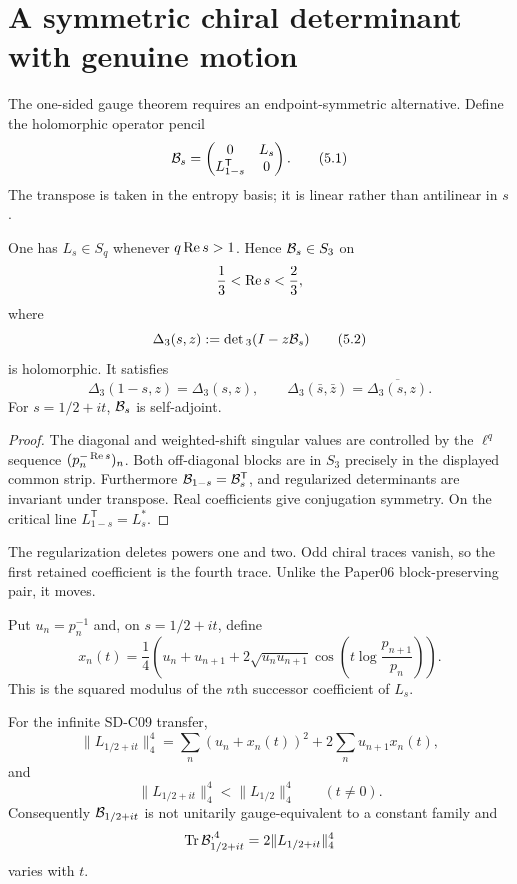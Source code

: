 \section{A symmetric chiral determinant with genuine motion}
\label{sec:chiral}

The one-sided gauge theorem requires an endpoint-symmetric alternative.
Define the holomorphic operator pencil
\[
 \mathcal B_s=
 \begin{pmatrix}
 0&L_s\\ L_{1-s}^{\mathsf T}&0
 \end{pmatrix}.                              \tag{5.1}
\]
The transpose is taken in the entropy basis; it is linear rather than
antilinear in $s$.

\begin{proposition}
\label{prop:strip}
One has $L_s\in S_q$ whenever $q\operatorname{Re} s>1$.  Hence
$\mathcal B_s\in S_3$ on
\[
 \frac13<\operatorname{Re} s<\frac23,
\]
where
\[
 \Delta_3(s,z):=\det{}_3(I-z\mathcal B_s)            \tag{5.2}
\]
is holomorphic.  It satisfies
\[
 \Delta_3(1-s,z)=\Delta_3(s,z),
 \qquad
 \Delta_3(\bar s,\bar z)=\overline{\Delta_3(s,z)}. \tag{5.3}
\]
For $s=1/2+it$, $\mathcal B_s$ is self-adjoint.
\end{proposition}

\begin{proof}
The diagonal and weighted-shift singular values are controlled by the
$\ell^q$ sequence $(p_n^{-\operatorname{Re} s})_n$.  Both off-diagonal blocks are in
$S_3$ precisely in the displayed common strip.  Furthermore
$\mathcal B_{1-s}=\mathcal B_s^{\mathsf T}$, and regularized determinants are invariant
under transpose.  Real coefficients give conjugation symmetry.  On the
critical line $L_{1-s}^{\mathsf T}=L_s^*$.
\end{proof}

The regularization deletes powers one and two.  Odd chiral traces vanish, so
the first retained coefficient is the fourth trace.  Unlike the Paper06
block-preserving pair, it moves.

Put $u_n=p_n^{-1}$ and, on $s=1/2+it$, define
\[
 x_n(t)=\frac14\left(u_n+u_{n+1}
 +2\sqrt{u_nu_{n+1}}
 \cos\left(t\log\frac{p_{n+1}}{p_n}\right)\right). \tag{5.4}
\]
This is the squared modulus of the $n$th successor coefficient of $L_s$.

\begin{theorem}
\label{thm:motion}
For the infinite SD-C09 transfer,
\[
 \|L_{1/2+it}\|_4^4
 =\sum_n(u_n+x_n(t))^2+2\sum_nu_{n+1}x_n(t), \tag{5.5}
\]
and
\[
 \|L_{1/2+it}\|_4^4<\|L_{1/2}\|_4^4
 \qquad(t\ne0).                              \tag{5.6}
\]
Consequently $\mathcal B_{1/2+it}$ is not unitarily gauge-equivalent to a constant
family and
\[
 \operatorname{Tr}\mathcal B_{1/2+it}^{,4}=2\|L_{1/2+it}\|_4^4
\]
varies with $t$.
\end{theorem}

